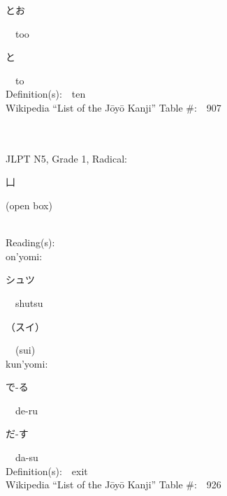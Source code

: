 \begin{multicols}{2}
{\hspace*{2em}}{\begin{CJK}{UTF8}{min} とお \end{CJK}}\ \ too\ \ \\
{\hspace*{2em}}{\begin{CJK}{UTF8}{min} と \end{CJK}}\ \ to\ \ \\
Definition(s):\ \ ten \\
Wikipedia ``List of the J\=oy\=o Kanji'' Table \#:\ \ 907 \\
\ \ \\
{\fontsize{34pt}{40pt}  }\ \ \\  %
{JLPT N5, Grade 1, Radical:\ \ {\begin{CJK}{UTF8}{min} 凵 \end{CJK}} (open box) } \\
Reading(s):\ \ \\
{\hspace*{1em}}on'yomi:\ \ \\
{\hspace*{2em}}{\begin{CJK}{UTF8}{min} シュツ \end{CJK}}\ \ shutsu\ \ \\
{\hspace*{2em}}{\begin{CJK}{UTF8}{min} （スイ） \end{CJK}}\ \ (sui)\ \ \\
{\hspace*{1em}}kun'yomi:\ \ \\
{\hspace*{2em}}{\begin{CJK}{UTF8}{min} で-る \end{CJK}}\ \ de-ru\ \ \\
{\hspace*{2em}}{\begin{CJK}{UTF8}{min} だ-す \end{CJK}}\ \ da-su\ \ \\
Definition(s):\ \ exit \\
Wikipedia ``List of the J\=oy\=o Kanji'' Table \#:\ \ 926 \\
\ \ \\
{\fontsize{34pt}{40pt}  }\ \ \\  %

\end{multicols}
